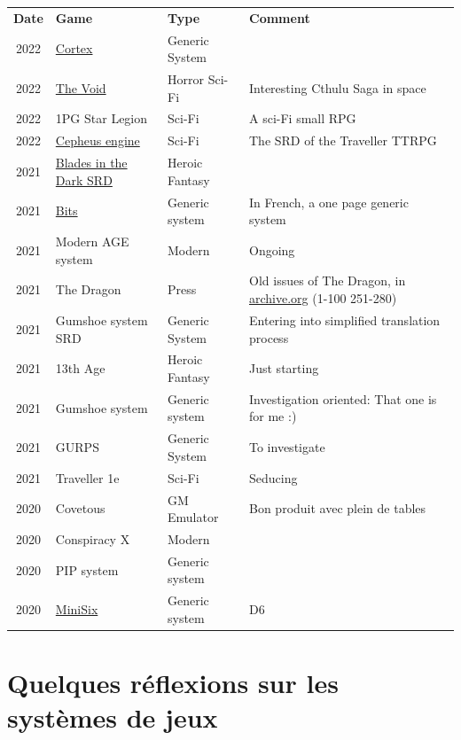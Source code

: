 \documentclass[a4paper, 11pt, twoside]{article}
\begin{document}
\begin{longtable}{cp{2cm}p{1.5cm}p{7cm}}
\textbf{Date} & \textbf{Game} & \textbf{Type} & \textbf{Comment}\\
2022 & \href{https://www.cortexrpg.com/compendium/explore-the-rules/}{Cortex} & Generic System & \\
2022 & \href{https://www.drivethrurpg.com/product/117563}{The Void} & Horror Sci-Fi & Interesting Cthulu Saga in space\\
2022 & 1PG Star Legion & Sci-Fi & A sci-Fi small RPG\\
2022 & \href{https://www.drivethrurpg.com/product/186894/Cepheus-Engine-System-Reference-Document}{Cepheus engine} & Sci-Fi & The SRD of the Traveller TTRPG\\
2021 & \href{https://github.com/orey/jdr/tree/master/BladesInTheDark-SRD}{Blades in the Dark SRD} & Heroic Fantasy & \\
2021 & \href{http://komajdr.free.fr/fichiers/BiTs.rar}{Bits } & Generic system & In French, a one page generic system\\
2021 & Modern AGE system & Modern & Ongoing\\
2021 & The Dragon & Press & Old issues of The Dragon, in \href{https://archive.org/details/DragonMagazine045\_201903}{archive.org} (1-100 251-280)\\
2021 & Gumshoe system SRD & Generic System & Entering into simplified translation process\\
2021 & 13th Age & Heroic Fantasy & Just starting\\
2021 & Gumshoe system & Generic system & Investigation oriented: That one is for me :)\\
2021 & GURPS & Generic System & To investigate\\
2021 & Traveller 1e & Sci-Fi & Seducing\\
2020 & Covetous & GM Emulator & Bon produit avec plein de tables\\
2020 & Conspiracy X & Modern & \\
2020 & PIP system & Generic system & \\
2020 & \href{https://www.drivethrurpg.com/product/144558/Mini-Six-Bare-Bones-Edition}{MiniSix} & Generic system & D6\\
\end{longtable}

\section{Quelques réflexions sur les systèmes de jeux}
\label{sec:org032eed1}
\end{document}

